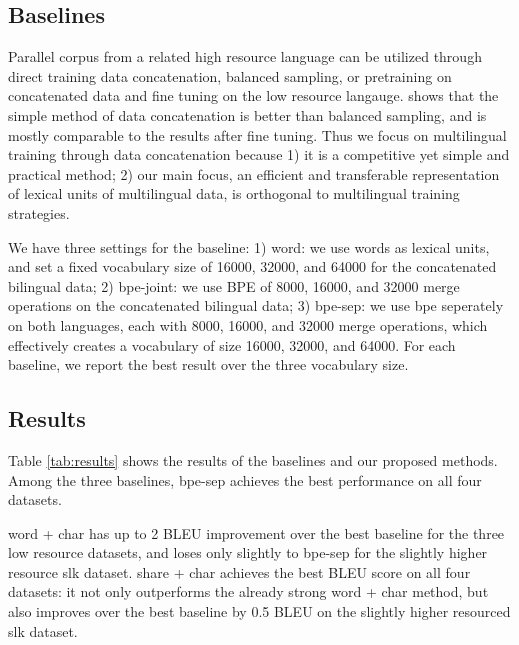 \subsection{Baselines}
Parallel corpus from a related high resource language can be utilized through direct training data concatenation, balanced sampling, or pretraining on concatenated data and fine tuning on the low resource langauge. \cite{rapid_adapt} shows that the simple method of data concatenation is better than balanced sampling, and is mostly comparable to the results after fine tuning. Thus we focus on multilingual training through data concatenation because 1) it is a competitive yet simple and practical method; 2) our main focus, an efficient and transferable representation of lexical units of multilingual data, is orthogonal to multilingual training strategies.

We have three settings for the baseline: 1) word: we use words as lexical units, and set a fixed vocabulary size of 16000, 32000, and 64000 for the concatenated bilingual data; 2) bpe-joint: we use BPE of 8000, 16000, and 32000 merge operations on the concatenated bilingual data; 3) bpe-sep: we use bpe seperately on both languages, each with 8000, 16000, and 32000 merge operations, which effectively creates a vocabulary of size 16000, 32000, and 64000. For each baseline, we report the best result over the three vocabulary size.

\subsection{Results}

Table \ref{tab:results} shows the results of the baselines and our proposed methods. Among the three baselines, bpe-sep achieves the best performance on all four datasets.   

word + char has up to 2 BLEU improvement over the best baseline for the three low resource datasets, and loses only slightly to bpe-sep for the slightly higher resource slk dataset. share + char achieves the best BLEU score on all four datasets: it not only outperforms the already strong word + char method, but also improves over the best baseline by 0.5 BLEU on the slightly higher resourced slk dataset.

